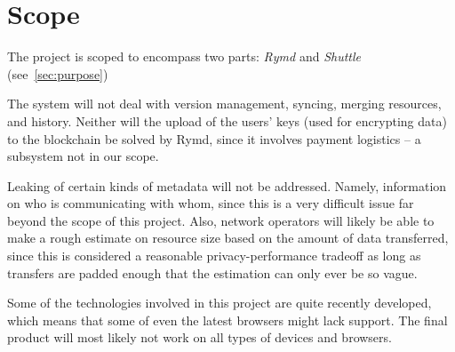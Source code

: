 \section{Scope}

The project is scoped to encompass two parts: \emph{Rymd} and \emph{Shuttle} (see~\ref{sec:purpose})

The system will not deal with version management, syncing, merging resources, and history. Neither will the upload of the users’ keys (used for encrypting data) to the blockchain be solved by Rymd, since it involves payment logistics – a subsystem not in our scope.

Leaking of certain kinds of metadata will not be addressed. Namely, information on who is communicating with whom, since this is a very difficult issue far beyond the scope of this project. Also, network operators will likely be able to make a rough estimate on resource size based on the amount of data transferred, since this is considered a reasonable privacy-performance tradeoff as long as transfers are padded enough that the estimation can only ever be so vague.

Some of the technologies involved in this project are quite recently developed, which means that some of even the latest browsers might lack support. The final product will most likely not work on all types of devices and browsers.
